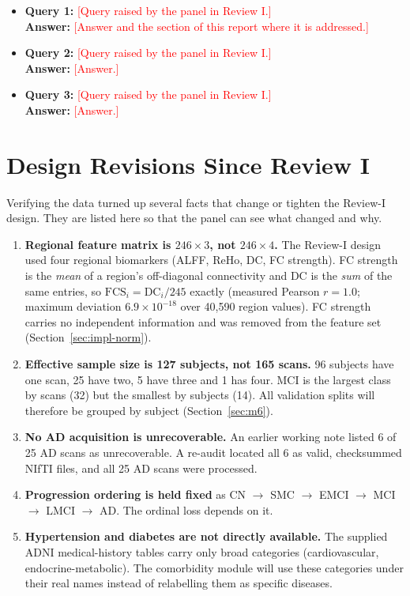 \documentclass{ssnreview}
\newcommand{\todo}[1]{\textcolor{red}{[#1]}}
\begin{document}
\begin{itemize}
  \item \textbf{Query 1:} \todo{Query raised by the panel in Review I.}\\
        \textbf{Answer:} \todo{Answer and the section of this report where it
        is addressed.}
  \item \textbf{Query 2:} \todo{Query raised by the panel in Review I.}\\
        \textbf{Answer:} \todo{Answer.}
  \item \textbf{Query 3:} \todo{Query raised by the panel in Review I.}\\
        \textbf{Answer:} \todo{Answer.}
\end{itemize}

\section{Design Revisions Since Review I}
Verifying the data turned up several facts that change or tighten the Review-I
design. They are listed here so that the panel can see what changed and why.

\begin{enumerate}[label=\textbf{R\arabic*.}]
  \item \textbf{Regional feature matrix is $246\times3$, not $246\times4$.}
        The Review-I design used four regional biomarkers (ALFF, ReHo, DC, FC
        strength). FC strength is the \emph{mean} of a region's off-diagonal
        connectivity and DC is the \emph{sum} of the same entries, so
        $\text{FCS}_i = \text{DC}_i/245$ exactly (measured Pearson
        $r = 1.0$; maximum deviation $6.9\times10^{-18}$ over 40,590 region
        values). FC strength carries no independent information and was
        removed from the feature set (Section~\ref{sec:impl-norm}).
  \item \textbf{Effective sample size is 127 subjects, not 165 scans.}
        96 subjects have one scan, 25 have two, 5 have three and 1 has four.
        MCI is the largest class by scans (32) but the smallest by subjects
        (14). All validation splits will therefore be grouped by subject
        (Section~\ref{sec:m6}).
  \item \textbf{No AD acquisition is unrecoverable.} An earlier working note
        listed 6 of 25 AD scans as unrecoverable. A re-audit located all 6 as
        valid, checksummed NIfTI files, and all 25 AD scans were processed.
  \item \textbf{Progression ordering is held fixed} as
        CN $\rightarrow$ SMC $\rightarrow$ EMCI $\rightarrow$ MCI $\rightarrow$
        LMCI $\rightarrow$ AD. The ordinal loss depends on it.
  \item \textbf{Hypertension and diabetes are not directly available.} The
        supplied ADNI medical-history tables carry only broad categories
        (cardiovascular, endocrine-metabolic). The comorbidity module will use
        these categories under their real names instead of relabelling them
        as specific diseases.
\end{enumerate}
\end{document}
